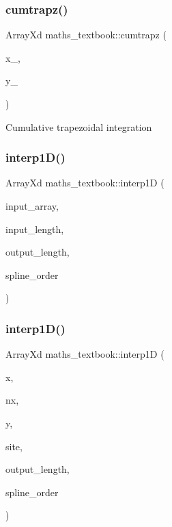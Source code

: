 \subsubsection{\texorpdfstring{cumtrapz()}{cumtrapz()}}
{\footnotesize\ttfamily Array\+Xd maths\+\_\+textbook\+::cumtrapz (\begin{DoxyParamCaption}\item[{Array\+Xd}]{x\+\_\+,  }\item[{Array\+Xd}]{y\+\_\+ }\end{DoxyParamCaption})}

Cumulative trapezoidal integration \mbox{\label{classmaths__textbook_a803caea252953788b96a898a3bab9bd0}} 
\subsubsection{\texorpdfstring{interp1\+D()}{interp1D()}\hspace{0.1cm}{\footnotesize\ttfamily [1/2]}}
{\footnotesize\ttfamily Array\+Xd maths\+\_\+textbook\+::interp1D (\begin{DoxyParamCaption}\item[{Array\+Xd}]{input\+\_\+array,  }\item[{int}]{input\+\_\+length,  }\item[{int}]{output\+\_\+length,  }\item[{int}]{spline\+\_\+order }\end{DoxyParamCaption})}

\mbox{\label{classmaths__textbook_ac4789e1e67a597303faab6cc5fa889ec}} 
\subsubsection{\texorpdfstring{interp1\+D()}{interp1D()}\hspace{0.1cm}{\footnotesize\ttfamily [2/2]}}
{\footnotesize\ttfamily Array\+Xd maths\+\_\+textbook\+::interp1D (\begin{DoxyParamCaption}\item[{Array\+Xd}]{x,  }\item[{int}]{nx,  }\item[{Array\+Xd}]{y,  }\item[{Array\+Xd}]{site,  }\item[{int}]{output\+\_\+length,  }\item[{int}]{spline\+\_\+order }\end{DoxyParamCaption})}

